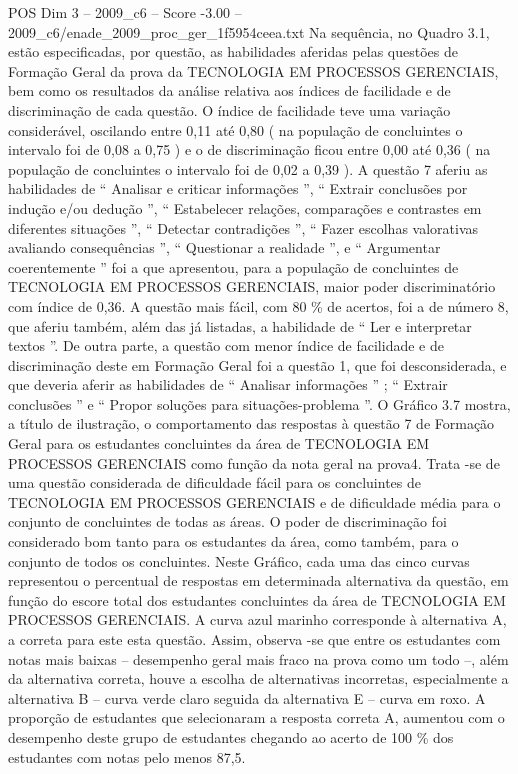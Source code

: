 \begin{textsample}{POS Dim 3 – 2009\_c6 – Score -3.00 – 2009\_c6/enade\_2009\_proc\_ger\_1f5954ceea.txt}
Na sequência, no Quadro 3.1, estão especificadas, por questão, as habilidades aferidas pelas questões de Formação Geral da prova da TECNOLOGIA EM PROCESSOS GERENCIAIS, bem como os resultados da análise relativa aos índices de facilidade e de discriminação de cada questão.
O índice de facilidade teve uma variação considerável, oscilando entre 0,11 até 0,80 ( na população de concluintes o intervalo foi de 0,08 a 0,75 ) e o de discriminação ficou entre 0,00 até 0,36 ( na população de concluintes o intervalo foi de 0,02 a 0,39 ).
A questão 7 aferiu as habilidades de “ Analisar e criticar informações ”, “ Extrair conclusões por indução e/ou dedução ”, “ Estabelecer relações, comparações e contrastes em diferentes situações ”, “ Detectar contradições ”, “ Fazer escolhas valorativas avaliando consequências ”, “ Questionar a realidade ”, e “ Argumentar coerentemente ” foi a que apresentou, para a população de concluintes de TECNOLOGIA EM PROCESSOS GERENCIAIS, maior poder discriminatório com índice de 0,36.
A questão mais fácil, com 80 \% de acertos, foi a de número 8, que aferiu também, além das já listadas, a habilidade de “ Ler e interpretar textos ”.
De outra parte, a questão com menor índice de facilidade e de discriminação deste em Formação Geral foi a questão 1, que foi desconsiderada, e que deveria aferir as habilidades de “ Analisar informações ” ; “ Extrair conclusões ” e “ Propor soluções para situações-problema ”.
O Gráfico 3.7 mostra, a título de ilustração, o comportamento das respostas à questão 7 de Formação Geral para os estudantes concluintes da área de TECNOLOGIA EM PROCESSOS GERENCIAIS como função da nota geral na prova4.
Trata -se de uma questão considerada de dificuldade fácil para os concluintes de TECNOLOGIA EM PROCESSOS GERENCIAIS e de dificuldade média para o conjunto de concluintes de todas as áreas.
O poder de discriminação foi considerado bom tanto para os estudantes da área, como também, para o conjunto de todos os concluintes.
Neste Gráfico, cada uma das cinco curvas representou o percentual de respostas em determinada alternativa da questão, em função do escore total dos estudantes concluintes da área de TECNOLOGIA EM PROCESSOS GERENCIAIS.
A curva azul marinho corresponde à alternativa A, a correta para este esta questão.
Assim, observa -se que entre os estudantes com notas mais baixas – desempenho geral mais fraco na prova como um todo –, além da alternativa correta, houve a escolha de alternativas incorretas, especialmente a alternativa B – curva verde claro seguida da alternativa E – curva em roxo.
A proporção de estudantes que selecionaram a resposta correta A, aumentou com o desempenho deste grupo de estudantes chegando ao acerto de 100 \% dos estudantes com notas pelo menos 87,5.

\end{textsample}
